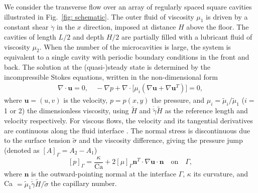 We consider the transverse flow over an array of regularly spaced square cavities illustrated in Fig.\ \ref{fig: schematic}. The outer fluid of viscosity $\mu_1$ is driven by a constant shear $\dot{\gamma}$ in the $x$ direction, imposed at distance $H$ above the floor. The cavities of length $L/2$ and depth $H/2$ are partially filled with a lubricant fluid of viscosity $\mu_2$. When the number of the microcavities is large, the system is equivalent to a single cavity with periodic boundary conditions in the front and back. The solution at the (quasi-)steady state is determined by the incompressible Stokes equations, written in the non-dimensional form
\begin{equation} \label{Stokes}
  \begin{aligned}
    \nabla \cdot {\bm u} = 0, \quad
    -\nabla p + \nabla \cdot \big[ \mu_i ( \nabla {\bm u} + \nabla {\bm u}^T ) \big] = 0,
  \end{aligned}
\end{equation}
where ${\bm u}=(u,v)$ is the velocity, $p=p(x,y)$ the pressure, and $\mu_i=\tilde{\mu}_i/\tilde{\mu}_1$ ($i=$ 1 or 2) the dimensionless viscosity, using $\tilde{H}$ and $\dot{\tilde{\gamma}} \tilde{H}$ as the reference length and velocity respectively. For viscous flows, the velocity and its tangential derivatives are continuous along the fluid interface \citep{Batchelor}. The normal stress is discontinuous due to the surface tension $\tilde{\sigma}$ and the viscosity difference, giving the pressure jump (denoted as $[A]_\Gamma=A_2-A_1$)
\begin{equation} \label{p jump}
  [p]_\Gamma = \frac{\kappa}{\textrm{Ca}} + 2[\mu]_\Gamma {\bm n}^T \cdot \nabla {\bm u} \cdot {\bm n} 
  \quad \textrm{on} \quad \Gamma,
\end{equation}
where ${\bm n}$ is the outward-pointing normal at the interface $\Gamma$, $\kappa$ its curvature, and Ca $=\tilde{\mu}_1 \dot{\tilde{\gamma}} \tilde{H}/\tilde{\sigma}$ the capillary number. 

